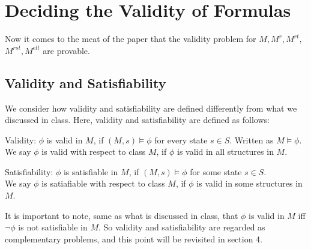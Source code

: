 \documentclass{article}
\begin{document}
\section{Deciding the Validity of Formulas}
\par Now it comes to the meat of the paper that the validity problem for $M,M^r,M^{rt},$\\$M^{rst},M^{elt}$ are provable.
\subsection{Validity and Satisfiability}
\par We consider how validity and satisfiability are defined differently from what we discussed in class. Here, validity and satisfiability are defined as follows: \\
\par Validity: $\phi$ is valid in $M$, if $(M,s)\vDash \phi$ for every state $s\in S$. Written as $M\vDash \phi$.\\We say $\phi$ is valid with respect to class $M$, if $\phi$ is valid in all structures in $M$.
\par Satisfiability: $\phi$ is satisfiable in $M$, if $(M,s)\vDash \phi$ for some state $s\in S$.\\We say $\phi$ is satiafiable with respect to class $M$, if $\phi$ is valid in some structures in $M$.
\par It is important to note, same as what is discussed in class, that $\phi$ is valid in $M$ iff $\lnot\phi$ is not satisfiable in $M$. So validity and satisfiability are regarded as complementary problems, and this point will be revisited in section 4.
\end{document}
